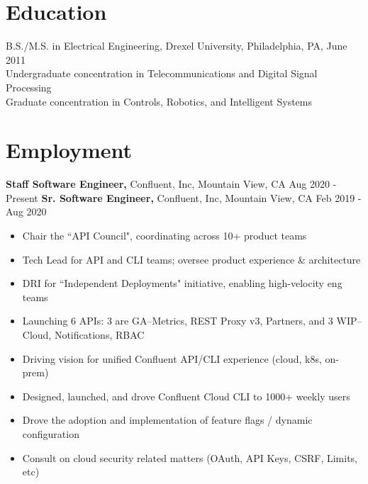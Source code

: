 \documentclass[margin]{res}
\begin{document}
 

 

\begin{resume} 


\section{Education} 
B.S./M.S. in Electrical Engineering, Drexel University, Philadelphia, PA, June 2011 \\
Undergraduate concentration in Telecommunications and Digital Signal Processing \\
Graduate concentration in Controls, Robotics, and Intelligent Systems 

\section{Employment}
{\bf Staff Software Engineer,} Confluent, Inc, Mountain View, CA \hfill Aug 2020 - Present
{\bf Sr. Software Engineer,} Confluent, Inc, Mountain View, CA \hfill Feb 2019 - Aug 2020
\begin{itemize} \itemsep -2pt  %
  \item Chair the ``API Council", coordinating across 10+ product teams
  \item Tech Lead for API and CLI teams; oversee product experience \& architecture
  \item DRI for ``Independent Deployments" initiative, enabling high-velocity eng teams
  \item Launching 6 APIs: 3 are GA--Metrics, REST Proxy v3, Partners, and 3 WIP--Cloud, Notifications, RBAC
  \item Driving vision for unified Confluent API/CLI experience (cloud, k8s, on-prem)
  \item Designed, launched, and drove Confluent Cloud CLI to 1000+ weekly users 
  \item Drove the adoption and implementation of feature flags / dynamic configuration
  \item Consult on cloud security related matters (OAuth, API Keys, CSRF, Limits, etc)
 \end{itemize}


\end{resume}
\end{document}
